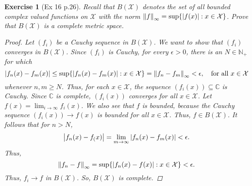 \documentclass[11pt]{article}
\newtheorem{exercise}{Exercise}
\newcommand{\N}{\mathbb{N}}
\newcommand{\X}{\mathcal{X}}
\begin{document}
\begin{exercise}[Ex 16 p.26]
	Recall that $B(\X)$ denotes the set of all bounded complex valued functions
	on $\X$ with the norm $\norm{f}_\infty = \sup \{|f(x)| : x \in \X \}$. Prove that $B(\X)$ is a complete metric space.

	\begin{proof}
		Let $(f_i)$ be a Cauchy sequence in $B(\X)$. We want to show that $(f_i)$ converges in $B(\X)$. Since $(f_i)$ is Cauchy, for every $\epsilon > 0$, there is an $N\in \N_+$ for which 
		\begin{equation*}
		\abs{f_n(x) - f_m(x)} \leq \sup\{ \abs{f_n(x) - f_m(x)} : x\in \X  \} = \norm{f_n - f_m}_\infty  < \epsilon, \quad \mbox{for all } x\in \X
		\end{equation*}
		whenever $n,m \geq N$. Thus, for each $x\in \X$, the sequence $(f_i(x)) \subseteq \mathbb{C}$ is Cauchy. Since $\mathbb{C}$ is complete, $(f_i(x))$ converges for all $x\in \X$. Let $f(x) = \lim_{i\to \infty} f_i(x)$. We also see that $f$ is bounded, because the Cauchy sequence $(f_i(x)) \to f(x)$ is bounded for all $x\in \X$. Thus, $f\in B(\X)$. It follows that for $n > N$,
		\begin{equation*}
		\abs{f_n(x) - f_(x)} = \lim_{m\to \infty}\abs{f_n(x) - f_m(x)} < \epsilon.
		\end{equation*} 
		Thus, 
		\begin{equation*}
		\norm{f_n - f}_\infty = \sup\{ \abs{f_n(x) - f(x)} : x\in \X \} < \epsilon.
		\end{equation*}
		Thus, $f_i \to f$ in $B(\X)$. So, $B(\X)$ is complete.
		
		
	\end{proof}
\end{exercise}
\end{document}
